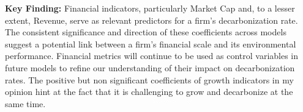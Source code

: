 \textbf{Key Finding:} Financial indicators, particularly Market Cap and, to a lesser extent, Revenue, serve as relevant predictors for a firm's decarbonization rate. The consistent significance and direction of these coefficients across models suggest a potential link between a firm's financial scale and its environmental performance. Financial metrics will continue to be used as control variables in future models to refine our understanding of their impact on decarbonization rates. The positive but non significant coefficients of growth indicators in my opinion hint at the fact that it is challenging to grow and decarbonize at the same time.






